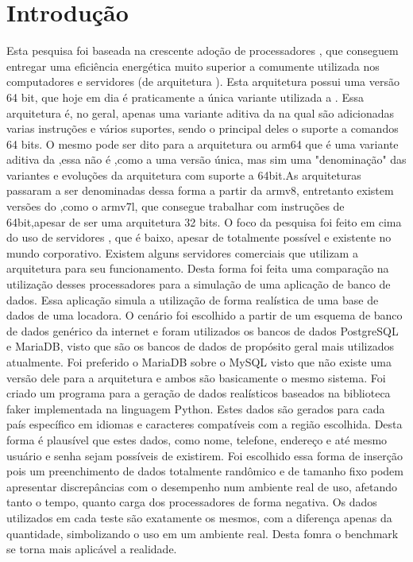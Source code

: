 \documentclass[
	12pt,				%
	openright,			%
	oneside,			%
	a4paper,			%
	english,			%
	french,				%
	spanish,			%
	brazil,				%
	]{abntex2}
\begin{document}
\chapter*{Introdução}
\label{ch:introducao}
Esta pesquisa foi baseada na crescente adoção de processadores , que conseguem entregar uma eficiência energética muito superior a comumente utilizada nos computadores e servidores (de arquitetura ).
Esta arquitetura possui uma versão 64 bit, que hoje em dia é praticamente a única variante utilizada a . Essa arquitetura é, no geral,
apenas uma variante aditiva da  na qual são adicionadas varias instruções e vários suportes, sendo o principal deles o suporte a comandos 64 bits.
O mesmo pode ser dito para a arquitetura  ou arm64 que é uma variante aditiva da ,essa não é ,como a  uma versão única,
mas sim uma "denominação" das variantes e evoluções da arquitetura  com suporte a 64bit.As arquiteturas passaram a ser denominadas dessa forma a partir da armv8,
entretanto existem versões do ,como o armv7l, que consegue trabalhar com instruções de 64bit,apesar de ser uma arquitetura 32 bits.\newline
O foco da pesquisa foi feito em cima do uso de servidores , que é baixo, apesar de totalmente possível e existente no mundo corporativo.
Existem alguns servidores comerciais que utilizam a arquitetura  para seu funcionamento. Desta forma foi feita uma comparação na utilização desses processadores para a simulação de uma aplicação de banco de dados. 
Essa aplicação simula a utilização de forma realística de uma base de dados de uma locadora. \newline
O cenário foi escolhido a partir de um esquema de banco de dados genérico da internet e foram utilizados os bancos de dados PostgreSQL e MariaDB, visto que são os bancos de dados de propósito geral mais utilizados atualmente.
Foi preferido o MariaDB sobre o MySQL visto que não existe uma versão dele para a arquitetura  e ambos são basicamente o mesmo sistema.\newline
Foi criado um programa para a geração de dados realísticos baseados na biblioteca faker implementada na linguagem Python. Estes dados são gerados para cada país específico em idiomas e caracteres compatíveis com a região escolhida.
Desta forma é plausível que estes dados, como nome, telefone, endereço e até mesmo usuário e senha sejam possíveis de existirem.
Foi escolhido essa forma de inserção pois um preenchimento de dados totalmente randômico e de tamanho fixo podem apresentar discrepâncias com o desempenho num ambiente real de uso,
afetando tanto o tempo, quanto carga dos processadores de forma negativa. Os dados utilizados em cada teste são exatamente os mesmos, com a diferença apenas da quantidade,
simbolizando o uso em um ambiente real. Desta fomra o benchmark se torna mais aplicável a realidade.\newline
\end{document}
